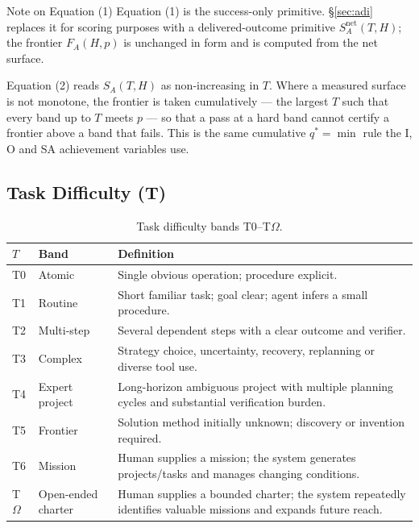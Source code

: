 \documentclass[11pt]{article}
\theoremstyle{definition}
\newcommand{\Om}{\ensuremath{\Omega}}
\newcommand{\SA}{\ensuremath{S_A(T,H)}}
\newcommand{\FA}{\ensuremath{F_A(H,p)}}
\begin{document}
\begin{addedbox}{Note on Equation (1)}
Equation (1) is the success-only primitive. \S\ref{sec:adi} replaces it for scoring purposes with a delivered-outcome primitive $S^{\text{net}}_A(T,H)$; the frontier \FA{} is unchanged in form and is computed from the net surface.

Equation (2) reads \SA{} as non-increasing in $T$. Where a measured surface is not monotone, the frontier is taken cumulatively --- the largest $T$ such that every band up to $T$ meets $p$ --- so that a pass at a hard band cannot certify a frontier above a band that fails. This is the same cumulative $q^{*}=\min$ rule the I, O and SA achievement variables use.
\end{addedbox}

\subsection{Task Difficulty (T)}

\begin{table}[H]
\centering\small
\begin{tabularx}{\textwidth}{@{}llY@{}}
\toprule
$T$ & Band & Definition \\
\midrule
T0 & Atomic & Single obvious operation; procedure explicit. \\
T1 & Routine & Short familiar task; goal clear; agent infers a small procedure. \\
T2 & Multi-step & Several dependent steps with a clear outcome and verifier. \\
T3 & Complex & Strategy choice, uncertainty, recovery, replanning or diverse tool use. \\
T4 & Expert project & Long-horizon ambiguous project with multiple planning cycles and substantial verification burden. \\
T5 & Frontier & Solution method initially unknown; discovery or invention required. \\
T6 & Mission & Human supplies a mission; the system generates projects/tasks and manages changing conditions. \\
T\Om{} & Open-ended charter & Human supplies a bounded charter; the system repeatedly identifies valuable missions and expands future reach. \\
\bottomrule
\end{tabularx}
\caption{Task difficulty bands T0--T\Om{}.}
\label{tab:t}
\end{table}
\end{document}
